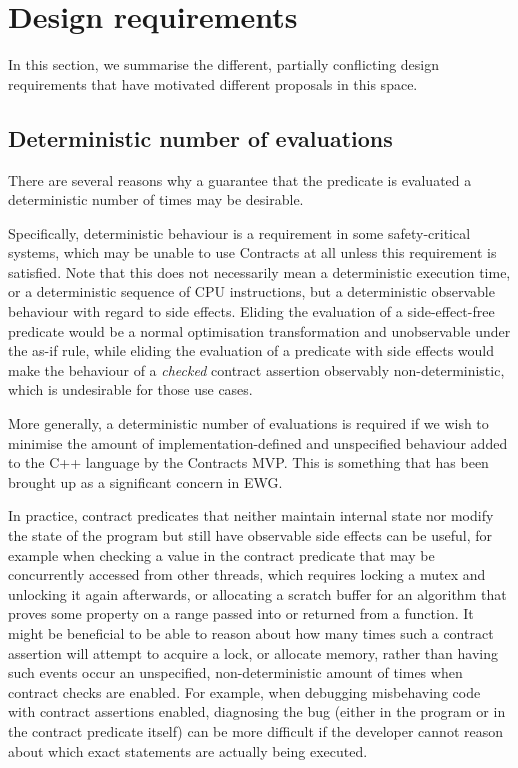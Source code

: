 
\section{Design requirements}
\label{sec:reqs}

In this section, we summarise the different, partially conflicting design requirements that have motivated different proposals in this space.

\subsection{Deterministic number of evaluations}
\label{subsec:determ}
There are several reasons why a guarantee that the predicate is evaluated a deterministic number of times may be desirable.

Specifically, deterministic behaviour is a requirement in some safety-critical systems, which may be unable to use Contracts at all unless this requirement is satisfied. Note that this does not necessarily mean a deterministic execution time, or a deterministic sequence of CPU instructions, but a deterministic observable behaviour with regard to side effects. Eliding the evaluation of a side-effect-free predicate would be a normal optimisation transformation and unobservable under the as-if rule, while eliding the evaluation of a predicate with side effects would make the behaviour of a \emph{checked} contract assertion observably non-deterministic, which is undesirable for those use cases.

More generally, a deterministic number of evaluations is required if we wish to minimise the amount of implementation-defined and unspecified behaviour added to the C++ language by the Contracts MVP. This is something that has been brought up as a significant concern in EWG.

In practice, contract predicates that neither maintain internal state nor modify the state of the program but still have observable side effects can be useful, for example when checking a value in the contract predicate that may be concurrently accessed from other threads, which requires locking a mutex and unlocking it again afterwards, or allocating a scratch buffer for an algorithm that proves some property on a range passed into or returned from a function. It might be beneficial to be able to reason about how many times such a contract assertion will attempt to acquire a lock, or allocate memory, rather than having such events occur an unspecified, non-deterministic amount of times when contract checks are enabled. For example, when debugging misbehaving code with contract assertions enabled, diagnosing the bug (either in the program or in the contract predicate itself) can be more difficult if the developer  cannot reason about which exact statements are actually being executed.

